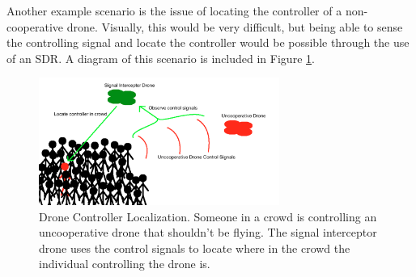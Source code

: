 Another example scenario is the issue of locating the controller of a non-cooperative drone. Visually, this would be very difficult, but being able to sense the controlling signal and locate the controller would be possible through the use of an SDR. A diagram of this scenario is included in Figure \ref{fig:locate_drone_crowd}. \par
\begin{figure}[h!]
\centering
\includegraphics[width=0.70\textwidth]{img/locate_drone_controller}
\caption{Drone Controller Localization. Someone in a crowd is controlling an uncooperative drone that shouldn't be flying. The signal interceptor drone uses the control signals to locate where in the crowd the individual controlling the drone is.}
\label{fig:locate_drone_crowd}
\end{figure}

